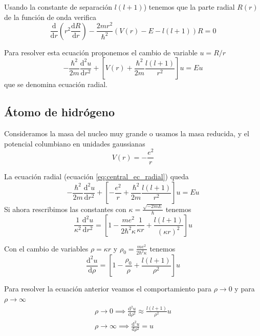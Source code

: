 \documentclass{book}
\numberwithin{equation}{section} %
\begin{document}
Usando la constante de separación $l (l + 1)$) tenemos que la parte radial $R(r)$ de la función de onda verifica
\begin{equation}
    \frac{\mathrm{d}}{\mathrm{d}r} \left(r^2 \frac{\mathrm{d} R}{\mathrm{d}r} \right) - \frac{2 m r^2}{\hbar^2} (V(r) - E - l(l + 1)) R = 0
\end{equation}

Para resolver esta ecuación proponemos el cambio de variable $u = R/r$
\begin{equation}
    -\frac{\hbar^2}{2m} \frac{\mathrm{d}^2 u}{\mathrm{d}r^2} + \left[ V(r) + \frac{\hbar^2}{2m} \frac{l (l + 1)}{r^2} \right] u = E u
    \label{eq:central_ec_radial}
\end{equation}
que se denomina ecuación radial.


\subsection{Átomo de hidrógeno}
Consideramos la masa del nucleo muy grande o usamos la masa reducida, y el potencial columbiano en unidades gaussianas
\begin{equation}
    V(r) = -\frac{e^2}{r}
\end{equation}

La ecuación radial (ecuación \ref{eq:central_ec_radial}) queda
\begin{equation}
    -\frac{\hbar^2}{2m} \frac{\mathrm{d}^2 u}{\mathrm{d}r^2} + \left[ - \frac{e^2}{r} + \frac{\hbar^2}{2m} \frac{l (l + 1)}{r^2} \right] u = E u
\end{equation}
Si ahora rescribimos las constantes con $\kappa = \frac{\sqrt{-2mE}}{\hbar}$ tenemos
\[\frac{1}{\kappa^2} \frac{\mathrm{d}^2 u}{\mathrm{d} r^2} = \left[1 - \frac{m e^2}{2 \hbar^2 \kappa} \frac{1}{\kappa r} + \frac{l (l + 1)}{(\kappa r)^2} \right] u\]

Con el cambio de variables $\rho = \kappa r$ y $\rho_0 = \frac{m e^2}{2 \hbar^2 \kappa}$ tenemos
\begin{equation}
    \frac{\mathrm{d}^2 u}{\mathrm{d}\rho} = \left[1 - \frac{\rho_0}{\rho} + \frac{l(l + 1)}{\rho^2}\right] u
\end{equation}

Para resolver la ecuación anterior veamos el comportamiento para $\rho \to 0$ y para $\rho \to \infty$
\begin{equation}
    \begin{gathered}
        \rho \to 0 \implies \frac{\mathrm{d}^2 u}{\mathrm{d} \rho^2} \approx \frac{l(l + 1)}{\rho^2} u\\
        \rho \to \infty \implies \frac{\mathrm{d}^2 u}{\mathrm{d} \rho^2} = u
    \end{gathered}
\end{equation}
\end{document}
